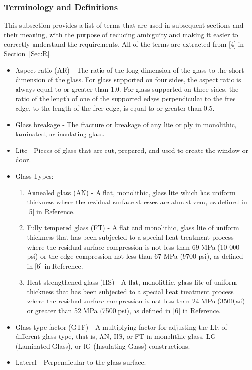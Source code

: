 \documentclass[12pt]{article}
\begin{document}
\subsubsection{Terminology and Definitions}
\label{Sec:TaD}
This subsection provides a list of terms that are used in subsequent sections and their meaning, with the purpose of reducing ambiguity and making it easier to correctly understand the requirements. All of the terms are extracted from [4] in Section~\ref{Sec:R}.
\begin{itemize}
\item{Aspect ratio (AR) - The ratio of the long dimension of the glass to the short dimension of the glass. For glass supported on four sides, the aspect ratio is always equal to or greater than 1.0. For glass supported on three sides, the ratio of the length of one of the supported edges perpendicular to the free edge, to the length of the free edge, is equal to or greater than 0.5.}
\item{Glass breakage - The fracture or breakage of any lite or ply in monolithic, laminated, or insulating glass.}
\item{Lite - Pieces of glass that are cut, prepared, and used to create the window or door.}
\item{Glass Types:}
\begin{enumerate}
\item{Annealed glass (AN) - A flat, monolithic, glass lite which has uniform thickness where the residual surface stresses are almost zero, as defined in [5] in Reference.}
\item{Fully tempered glass (FT) - A flat and monolithic, glass lite of uniform thickness that has been subjected to a special heat treatment process where the residual surface compression is not less than 69 MPa (10 000 psi) or the edge compression not less than 67 MPa (9700 psi), as defined in [6] in Reference.}
\item{Heat strengthened glass (HS) - A flat, monolithic, glass lite of uniform thickness that has been subjected to a special heat treatment process where the residual surface compression is not less than 24 MPa (3500psi) or greater than 52 MPa (7500 psi), as defined in [6] in Reference.}
\end{enumerate}
\item{Glass type factor (GTF) - A multiplying factor for adjusting the LR of different glass type, that is, AN, HS, or FT in monolithic glass, LG (Laminated Glass), or IG (Insulating Glass) constructions.}
\item{Lateral - Perpendicular to the glass surface.}

\end{itemize}
\end{document}
